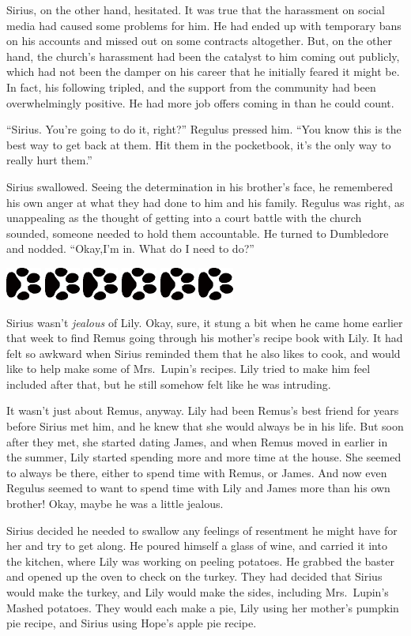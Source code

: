 \documentclass[12pt,twoside,openright]{memoir}
\newcommand{\myrulez}{	
	\begin{center}
		\hspace{.5em}
		\includegraphics[angle=60]{dogprint.pdf}
		\hspace{.5em}
		\includegraphics[angle=120]{dogprint.pdf}
		\hspace{.5em}
		\includegraphics[angle=60]{dogprint.pdf}
		\hspace{.5em}
		\includegraphics[angle=120]{dogprint.pdf}
		\hspace{.5em}
		\includegraphics[angle=60]{dogprint.pdf}
		\hspace{.5em}
		\includegraphics[angle=120]{dogprint.pdf}
		\hspace{.5em}
	\end{center}
}
\begin{document}
Sirius, on the other hand, hesitated. It was true that the harassment on social media had caused some problems for him. He had ended up with temporary bans on his accounts and missed out on some contracts altogether. But, on the other hand, the church's harassment had been the catalyst to him coming out publicly, which had not been the damper on his career that he initially feared it might be. In fact, his following tripled, and the support from the community had been overwhelmingly positive. He had more job offers coming in than he could count. 

``Sirius. You're going to do it, right?'' Regulus pressed him. ``You know this is the best way to get back at them. Hit them in the pocketbook, it's the only way to really hurt them.'' 

Sirius swallowed. Seeing the determination in his brother's face, he remembered his own anger at what they had done to him and his family. Regulus was right, as unappealing as the thought of getting into a court battle with the church sounded, someone needed to hold them accountable. He turned to Dumbledore and nodded. ``Okay,I'm in. What do I need to do?''

\myrulez

Sirius wasn't \textit{jealous} of Lily. Okay, sure, it stung a bit when he came home earlier that week to find Remus going through his mother's recipe book with Lily. It had felt so awkward when Sirius reminded them that he also likes to cook, and would like to help make some of Mrs.\ Lupin's recipes. Lily tried to make him feel included after that, but he still somehow felt like he was intruding. 

It wasn't just about Remus, anyway. Lily had been Remus's best friend for years before Sirius met him, and he knew that she would always be in his life. But soon after they met, she started dating James, and when Remus moved in earlier in the summer, Lily started spending more and more time at the house. She seemed to always be there, either to spend time with Remus, or James. And now even Regulus seemed to want to spend time with Lily and James more than his own brother! Okay, maybe he was a little jealous.

Sirius decided he needed to swallow any feelings of resentment he might have for her and try to get along. He poured himself a glass of wine, and carried it into the kitchen, where Lily was working on peeling potatoes. He grabbed the baster and opened up the oven to check on the turkey. They had decided that Sirius would make the turkey, and Lily would make the sides, including Mrs.\ Lupin's Mashed potatoes. They would each make a pie, Lily using her mother's pumpkin pie recipe, and Sirius using Hope's apple pie recipe. 
\end{document}
